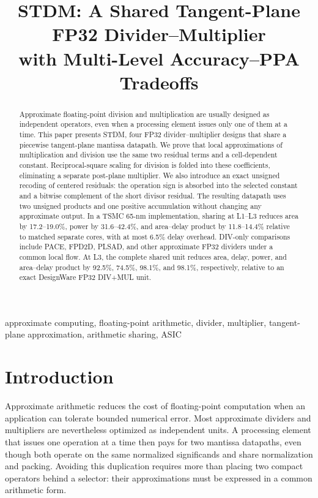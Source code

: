 \documentclass[conference]{IEEEtran}
\title{STDM: A Shared Tangent-Plane FP32 Divider--Multiplier\\
with Multi-Level Accuracy--PPA Tradeoffs}
\author{\IEEEauthorblockN{Pingchuan Dong}
}
\begin{document}
\maketitle

\begin{abstract}
Approximate floating-point division and multiplication are usually designed as
independent operators, even when a processing element issues only one of them
at a time. This paper presents STDM, four FP32 divider--multiplier designs that
share a piecewise tangent-plane mantissa datapath. We prove that local
approximations of multiplication and division use the same two residual terms
and a cell-dependent constant. Reciprocal-square scaling for division is folded
into these coefficients, eliminating a separate post-plane multiplier. We also
introduce an exact unsigned recoding of centered residuals: the operation sign
is absorbed into the selected constant and a bitwise complement of the short
divisor residual. The resulting datapath uses two unsigned products and one
positive accumulation without changing any approximate output. In a TSMC
65-nm implementation, sharing at L1--L3 reduces area by 17.2--19.0\%, power by
31.6--42.4\%, and area--delay product by 11.8--14.4\% relative to matched
separate cores, with at most 6.5\% delay overhead. DIV-only comparisons include
PACE, FPD2D, PLSAD, and other approximate FP32 dividers under a common local
flow. At L3, the complete shared unit reduces area, delay, power, and
area--delay product by 92.5\%, 74.5\%, 98.1\%, and 98.1\%, respectively,
relative to an exact DesignWare FP32 DIV+MUL unit.
\end{abstract}

\begin{IEEEkeywords}
approximate computing, floating-point arithmetic, divider, multiplier,
tangent-plane approximation, arithmetic sharing, ASIC
\end{IEEEkeywords}

\section{Introduction}
Approximate arithmetic reduces the cost of floating-point computation when an
application can tolerate bounded numerical error. Most approximate dividers
and multipliers are nevertheless optimized as independent units. A processing
element that issues one operation at a time then pays for two mantissa
datapaths, even though both operate on the same normalized significands and
share normalization and packing. Avoiding this duplication requires more than
placing two compact operators behind a selector: their approximations must be
expressed in a common arithmetic form.
\end{document}
